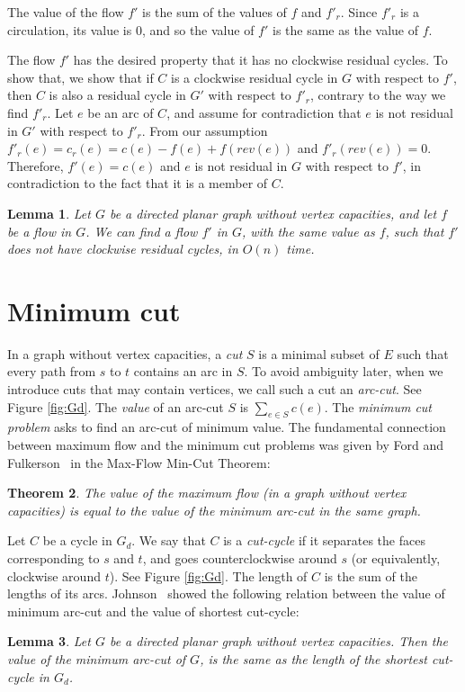 \documentclass[a4paper,11pt]{article}
\newtheorem{theorem}{Theorem}[section]
\newtheorem{lemma}[theorem]{Lemma}
\begin{document}
The value of the flow $f'$ is the sum of the values of $f$ and $f'_r$. Since
$f'_r$ is a circulation, its value is $0$, and so the value of $f'$ is the
same as the value of $f$.

The flow $f'$ has the desired property that it has no clockwise residual
cycles. To show that, we show that if $C$ is a clockwise residual cycle in
$G$ with respect to $f'$, then $C$ is also a residual cycle in $G'$
with respect to $f'_r$, contrary to the way we find $f'_r$.
Let $e$ be an arc of $C$, and assume for contradiction
that $e$ is not residual in $G'$ with respect to $f'_r$.  From our
assumption $f'_r(e) = c_r(e) = c(e) - f(e) + f(rev(e))$ and $f'_r(rev(e)) = 0$.
Therefore, $f'(e) = c(e)$ and $e$ is not residual in $G$ with respect to $f'$, in
contradiction to the fact that it is a member of $C$.

\begin{lemma}
	Let $G$ be a directed planar graph without vertex capacities, and let $f$ be a flow in $G$. We can find a flow $f'$ in $G$, with the same value as $f$, such that $f'$ does not have clockwise residual cycles, in $O(n)$ time.
\end{lemma}


\section{Minimum cut} \label{sec:cut}

In a graph without vertex capacities, a \emph{cut} $S$ is a minimal subset of $E$ such that every path from $s$ to $t$ contains an arc in $S$. To avoid ambiguity later, when we introduce cuts that may contain vertices, we call such a cut an \emph{arc-cut}. See Figure \ref{fig:Gd}. The \emph{value} of an arc-cut $S$ is $\sum_{e \in S} c(e)$. The \emph{minimum cut problem} asks to find an arc-cut of minimum value. The fundamental connection between maximum flow and the minimum cut problems was given by Ford and Fulkerson~\cite{FF62} in the Max-Flow Min-Cut Theorem:
\begin{theorem}\cite{FF62} \label{thm:mfmc}
    The value of the maximum flow (in a graph without vertex capacities) is equal to the value of the minimum arc-cut in the same graph.
\end{theorem}

Let $C$ be a cycle in $G_d$. We say that $C$ is a \emph{cut-cycle} if
it separates the faces corresponding to $s$ and $t$, and goes
counterclockwise around $s$ (or equivalently, clockwise around $t$).
See Figure \ref{fig:Gd}. The length of $C$ is the sum of the lengths of its
 arcs. Johnson~\cite{J87} showed the following relation between
the value of minimum arc-cut and the value of shortest cut-cycle:
\begin{lemma} \cite{J87} \label{lem:mcc}
    Let $G$ be a directed planar graph without vertex capacities. Then the value of the minimum arc-cut of $G$, is the same as the length of the shortest cut-cycle in $G_d$.
\end{lemma}
\end{document}
